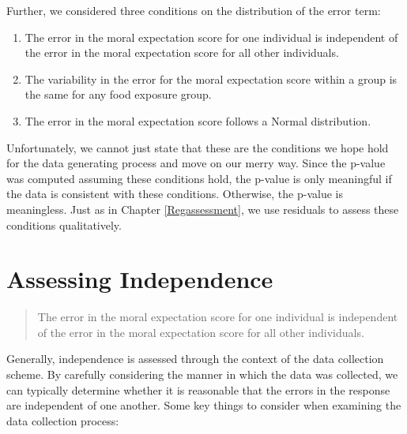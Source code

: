 \documentclass[
]{book}
\providecommand{\tightlist}{%
  \setlength{\itemsep}{0pt}\setlength{\parskip}{0pt}}
\theoremstyle{plain}
\theoremstyle{mydefn}
\theoremstyle{myexmpl}
\theoremstyle{remark}
\begin{document}
Further, we considered three conditions on the distribution of the error term:

\begin{enumerate}
\def\labelenumi{\arabic{enumi}.}
\tightlist
\item
  The error in the moral expectation score for one individual is independent of the error in the moral expectation score for all other individuals.\\
\item
  The variability in the error for the moral expectation score within a group is the same for any food exposure group.
\item
  The error in the moral expectation score follows a Normal distribution.
\end{enumerate}

Unfortunately, we cannot just state that these are the conditions we hope hold for the data generating process and move on our merry way. Since the p-value was computed assuming these conditions hold, the p-value is only meaningful if the data is consistent with these conditions. Otherwise, the p-value is meaningless. Just as in Chapter \ref{Regassessment}, we use residuals to assess these conditions qualitatively.

\hypertarget{assessing-independence-1}{%
\section{Assessing Independence}\label{assessing-independence-1}}

\begin{quote}
The error in the moral expectation score for one individual is independent of the error in the moral expectation score for all other individuals.
\end{quote}

Generally, independence is assessed through the context of the data collection scheme. By carefully considering the manner in which the data was collected, we can typically determine whether it is reasonable that the errors in the response are independent of one another. Some key things to consider when examining the data collection process:
\end{document}
